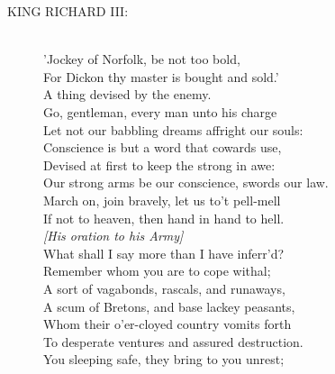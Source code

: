 \documentclass{article}
\begin{document}
\begin{description}
\item[KING RICHARD III:] 
\hspace{1pt}\\
\hspace{1pt}'Jockey of Norfolk, be not too bold,\\
\hspace{1pt}For Dickon thy master is bought and sold.'\\
\hspace{1pt}A thing devised by the enemy.\\
\hspace{1pt}Go, gentleman, every man unto his charge\\
\hspace{1pt}Let not our babbling dreams affright our souls:\\
\hspace{1pt}Conscience is but a word that cowards use,\\
\hspace{1pt}Devised at first to keep the strong in awe:\\
\hspace{1pt}Our strong arms be our conscience, swords our law.\\
\hspace{1pt}March on, join bravely, let us to't pell-mell\\
\hspace{1pt}If not to heaven, then hand in hand to hell.\\
{\it [His oration to his Army]}\\
\hspace{1pt}What shall I say more than I have inferr'd?\\
\hspace{1pt}Remember whom you are to cope withal;\\
\hspace{1pt}A sort of vagabonds, rascals, and runaways,\\
\hspace{1pt}A scum of Bretons, and base lackey peasants,\\
\hspace{1pt}Whom their o'er-cloyed country vomits forth\\
\hspace{1pt}To desperate ventures and assured destruction.\\
\hspace{1pt}You sleeping safe, they bring to you unrest;\\

\end{description}
\end{document}
